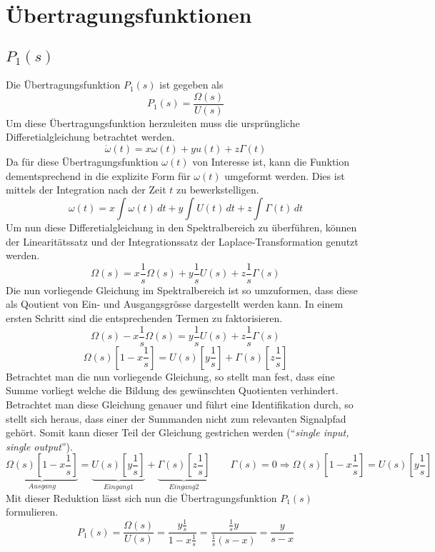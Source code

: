 \section{Übertragungsfunktionen}

\subsection{$P_1(s)$}
Die Übertragungsfunktion $P_1(s)$ ist gegeben als
\[
	P_1(s) = \frac{\Omega(s)}{U(s)}
\]
Um diese Übertragungsfunktion herzuleiten muss die ursprüngliche
Differetialgleichung betrachtet werden.
\[
	\dot\omega(t) = x \omega(t) + y u(t) + z \Gamma(t)
\]
Da für diese Übertragungsfunktion $\omega(t)$ von Interesse ist, kann die
Funktion dementsprechend in die explizite Form für $\omega(t)$ umgeformt
werden. Dies ist mittels der Integration nach der Zeit $t$ zu bewerkstelligen.
\[
	\omega(t) =
		x \int\omega(t)\,dt
		+ y \int U(t)\,dt 
		+ z \int\Gamma(t)\,dt
\]
Um nun diese Differetialgleichung in den Spektralbereich zu überführen,
können der Linearitätssatz und der Integrationssatz der Laplace-Transformation
genutzt werden.
\[
	\Omega(s) =
		x \frac{1}{s} \Omega(s) 
		+ y \frac{1}{s} U(s)
		+ z \frac{1}{s} \Gamma(s) 
\]
Die nun vorliegende Gleichung im Spektralbereich ist so umzuformen, dass diese
als Qoutient von Ein- und Ausgangsgrösse dargestellt werden kann. In einem
ersten Schritt sind die entsprechenden Termen zu faktorisieren.
\[
	\Omega(s) - x \frac{1}{s} \Omega(s) =
		y \frac{1}{s} U(s) + z \frac{1}{s} \Gamma(s)
\]
\[
	\Omega(s) \left[ 1 - x \frac{1}{s} \right] =
		U(s) \left[ y \frac{1}{s} \right]
		+ \Gamma(s) \left[ z \frac{1}{s}\right]
\]
Betrachtet man die nun vorliegende Gleichung, so stellt man fest, dass eine
Summe vorliegt welche die Bildung des gewünschten Quotienten verhindert.
Betrachtet man diese Gleichung genauer und führt eine Identifikation durch, so
stellt sich heraus, dass einer der Summanden nicht zum relevanten Signalpfad
gehört. Somit kann dieser Teil der Gleichung gestrichen werden
(``\emph{single input, single output}'').
\[
	\underbrace{\Omega(s) \left[ 1 - x \frac{1}{s} \right]}_{Ausgang} =
		\underbrace{U(s) \left[ y \frac{1}{s} \right]}_{Eingang 1}
		+ \underbrace{\Gamma(s) \left[ z \frac{1}{s}\right]}_{Eingang 2}
	\qquad \Gamma(s) = 0 \Rightarrow
		\Omega(s) \left[ 1 - x \frac{1}{s} \right] =
		U(s) \left[ y \frac{1}{s} \right]
\]
Mit dieser Reduktion lässt sich nun die Übertragungsfunktion $P_1(s)$
formulieren.
\[
	P_1(s) = \frac{\Omega(s)}{U(s)} =
		\frac{y \frac{1}{s}}{1 - x \frac{1}{s}} = 
		\frac{\frac{1}{s} y}{\frac{1}{s} (s-x)} =
		\frac{y}{s-x}
\]

